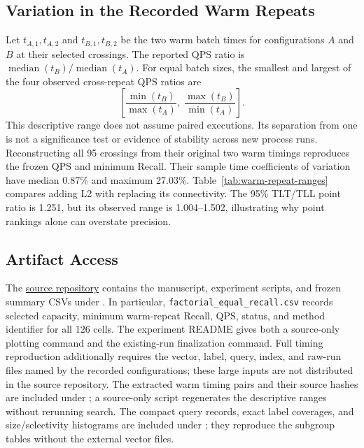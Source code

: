 \subsection{Variation in the Recorded Warm Repeats}
Let $t_{A,1},t_{A,2}$ and $t_{B,1},t_{B,2}$ be the two warm batch times for
configurations $A$ and $B$ at their selected crossings. The reported QPS
ratio is $\operatorname{median}(t_B)/\operatorname{median}(t_A)$.
For equal batch sizes, the smallest and largest of the four observed
cross-repeat QPS ratios are
\[
 \left[\frac{\min(t_B)}{\max(t_A)},\;
       \frac{\max(t_B)}{\min(t_A)}\right].
\]
This descriptive range does not assume paired executions. Its separation
from one is not a significance test or evidence of stability across new
process runs. Reconstructing all 95 crossings from their original two warm
timings reproduces the frozen QPS and minimum Recall. Their sample
time coefficients of variation have median 0.87\% and maximum 27.03\%.
Table~\ref{tab:warm-repeat-ranges} compares adding L2 with replacing its
connectivity. The 95\% TLT/TLL point ratio is 1.251, but its observed range
is 1.004--1.502, illustrating why point rankings alone can overstate precision.
\warmRepeatRanges

\subsection{Artifact Access}
The \href{https://github.com/panjd123/FilterVectorCode_refactor}{source repository}
contains the manuscript, experiment scripts, and frozen summary CSVs under
. In particular,
\texttt{factorial\_equal\_recall.csv} records selected capacity, minimum
warm-repeat Recall, QPS, status, and method identifier for all 126 cells.
The experiment README gives both a source-only plotting command and the
existing-run finalization command. Full timing reproduction additionally
requires the vector, label, query, index, and raw-run files named by the
recorded configurations; these large inputs are not distributed in the
source repository.
The extracted warm timing pairs and their source hashes are included under
; a source-only script regenerates the
descriptive ranges without rerunning search.
The compact query records, exact label coverages, and size/selectivity
histograms are included under ; they
reproduce the subgroup tables without the external vector files.

